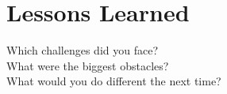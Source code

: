 \section{Lessons Learned}
Which challenges did you face? \\
What were the biggest obstacles? \\
What would you do different the next time?